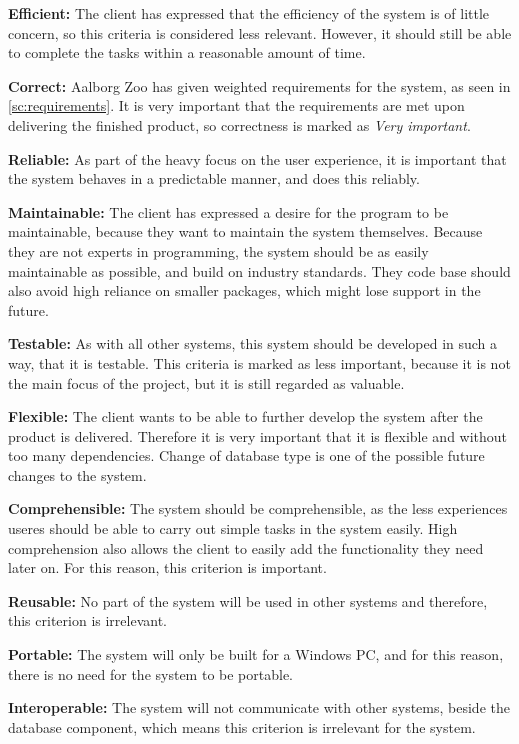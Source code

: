 \textbf{Efficient:} The client has expressed that the efficiency of the system is of little concern, so this criteria is considered less relevant. However, it should still be able to complete the tasks within a reasonable amount of time.

\textbf{Correct:} Aalborg Zoo has given weighted requirements for the system, as seen in \autoref{sc:requirements}. It is very important that the requirements are met upon delivering the finished product, so correctness is marked as \textit{Very important}.

\textbf{Reliable:} As part of the heavy focus on the user experience, it is important that the system behaves in a predictable manner, and does this reliably.

\textbf{Maintainable:} The client has expressed a desire for the program to be maintainable, because they want to maintain the system themselves. Because they are not experts in programming, the system should be as easily maintainable as possible, and build on industry standards. They code base should also avoid high reliance on smaller packages, which might lose support in the future.

\textbf{Testable:} As with all other systems, this system should be developed in such a way, that it is testable. This criteria is marked as less important, because it is not the main focus of the project, but it is still regarded as valuable.

\textbf{Flexible:} The client wants to be able to further develop the system after the product is delivered. Therefore it is very important that it is flexible and without too many dependencies. Change of database type is one of the possible future changes to the system.

\textbf{Comprehensible:} The system should be comprehensible, as the less experiences useres should be able to carry out simple tasks in the system easily. High comprehension also allows the client to easily add the functionality they need later on. For this reason, this criterion is important.

\textbf{Reusable:} No part of the system will be used in other systems and therefore, this criterion is irrelevant.

\textbf{Portable:} The system will only be built for a Windows PC, and for this reason, there is no need for the system to be portable. 

\textbf{Interoperable:} The system will not communicate with other systems, beside the database component, which means this criterion is irrelevant for the system.